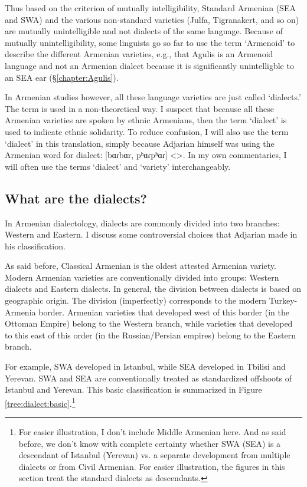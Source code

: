 Thus based on the criterion of mutually intelligibility, Standard Armenian (SEA and SWA) and the various non-standard varieties (Julfa, Tigranakert, and so on) are mutually unintelligible and not dialects of the same language. Because of mutually unintelligibility, some linguists go so far to use the term `Armenoid' to describe the different Armenian varieties, e.g., that Agulis is an Armenoid language \citep{Vaux-2008-ArmenianZok} and not an Armenian dialect because it is significantly unintelligble to an SEA ear (\S\ref{chapter:Agulis}). 

In Armenian studies however, all these language varieties are just called `dialects.'  The term is used in a non-theoretical way. I suspect that because all these Armenian varieties are spoken by ethnic Armenians, then the term `dialect' is used to indicate ethnic solidarity. To reduce confusion, I will also use the term `dialect' in this translation, simply because Adjarian himself was using the Armenian word for dialect: [bɑɾbɑr, pʰɑɾpʰɑɾ] <>. In my own commentaries, I will often use the terms `dialect' and `variety' interchangeably. 





\subsection{What are the dialects?}\label{sec:HossepIntro:armenian:whataredialect}

In Armenian dialectology, dialects are commonly divided into two branches: Western and Eastern. I discuss some controversial choices that Adjarian made in his classification. 


As said before, Classical Armenian is the oldest attested Armenian variety. Modern Armenian varieties are conventionally divided into groups: Western dialects and Eastern dialects. In general, the division between dialects is based on geographic origin. The division (imperfectly) corresponds to the modern Turkey-Armenia border. Armenian varieties that developed west of this border (in the Ottoman Empire) belong to the Western branch, while varieties that developed to this east of this order (in the Russian/Persian empires) belong to the Eastern branch. 

For example, SWA developed in Istanbul, while SEA developed in Tbilisi and Yerevan. SWA and SEA are conventionally treated as standardized offshoots of Istanbul and Yerevan. This basic classification is summarized in Figure \ref{tree:dialect:basic}.\footnote{For easier illustration, I don't include Middle Armenian here. And as said before, we don't know with complete certainty whether SWA (SEA) is a descendant of Istanbul (Yerevan) vs. a separate development from multiple dialects or from Civil Armenian. For easier illustration, the figures in this section treat the standard dialects as descendants. }

